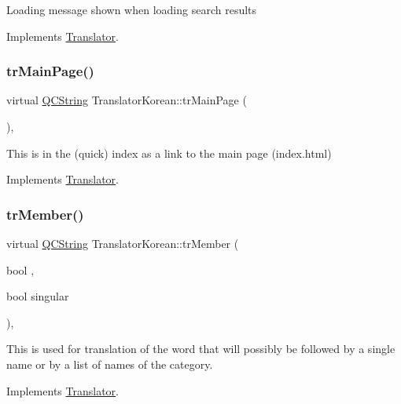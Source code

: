 Loading message shown when loading search results 

Implements \mbox{\hyperlink{class_translator}{Translator}}.

\mbox{\label{class_translator_korean_a3bd080d9676a9ed087342e3410f7864f}} 
\subsubsection{\texorpdfstring{trMainPage()}{trMainPage()}}
{\footnotesize\ttfamily virtual \mbox{\hyperlink{class_q_c_string}{Q\+C\+String}} Translator\+Korean\+::tr\+Main\+Page (\begin{DoxyParamCaption}{ }\end{DoxyParamCaption})\hspace{0.3cm}{\ttfamily [inline]}, {\ttfamily [virtual]}}

This is in the (quick) index as a link to the main page (index.\+html) 

Implements \mbox{\hyperlink{class_translator}{Translator}}.

\mbox{\label{class_translator_korean_a7de68f427722af2148122f7863b099d2}} 
\subsubsection{\texorpdfstring{trMember()}{trMember()}}
{\footnotesize\ttfamily virtual \mbox{\hyperlink{class_q_c_string}{Q\+C\+String}} Translator\+Korean\+::tr\+Member (\begin{DoxyParamCaption}\item[{bool}]{,  }\item[{bool}]{singular }\end{DoxyParamCaption})\hspace{0.3cm}{\ttfamily [inline]}, {\ttfamily [virtual]}}

This is used for translation of the word that will possibly be followed by a single name or by a list of names of the category. 

Implements \mbox{\hyperlink{class_translator}{Translator}}.

\mbox{\label{class_translator_korean_acf6f5ef874132851f5c4aee0e1ebbea8}} 
